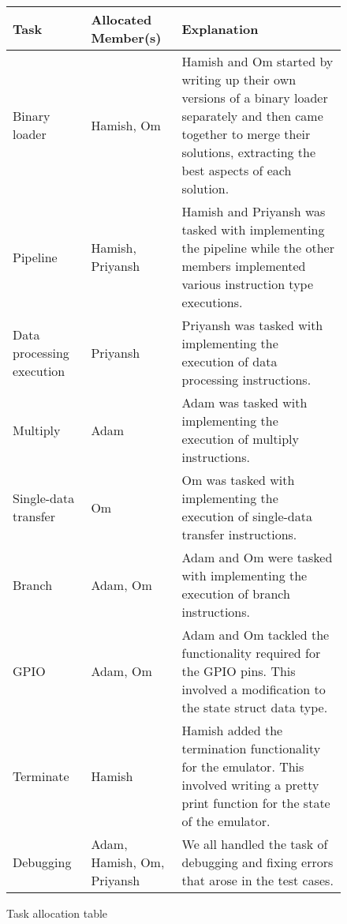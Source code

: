 \documentclass{article}
\begin{document}
\begin{center}
\begin{figure}[H]
\begin{tabular}{||m{}|m{}|m{}||}
  \hline
  Task & Allocated Member(s) & Explanation \\ [0.5ex]
  \hline
  \hline
  Binary loader & Hamish, Om & Hamish and Om started by writing up their own versions of a binary loader separately and then came together to merge their solutions, extracting the best aspects of each solution.   \\ 
  \hline
  Pipeline & Hamish, Priyansh & Hamish and Priyansh was tasked with implementing the pipeline while the other members implemented various instruction type executions. \\ 
  \hline
  Data processing execution & Priyansh & Priyansh was tasked with implementing the execution of data processing instructions. \\ 
  \hline
  Multiply & Adam & Adam was tasked with implementing the execution of multiply instructions. \\
  \hline
  Single-data transfer & Om & Om was tasked with implementing the execution of single-data transfer instructions. \\
  \hline
  Branch & Adam, Om & Adam and Om were tasked with implementing the execution of branch instructions. \\
  \hline
  GPIO & Adam, Om & Adam and Om tackled the functionality required for the GPIO pins. This involved a modification to the state struct data type. \\
  \hline
  Terminate & Hamish & Hamish added the termination functionality for the emulator. This involved writing a pretty print function for the state of the emulator. \\ 
  \hline
  Debugging & Adam, Hamish, Om, Priyansh & We all handled the task of debugging and fixing errors that arose in the test cases. \\
  \hline
\end{tabular}
\caption{Task allocation table}
\end{figure}
\end{center}
\end{document}
